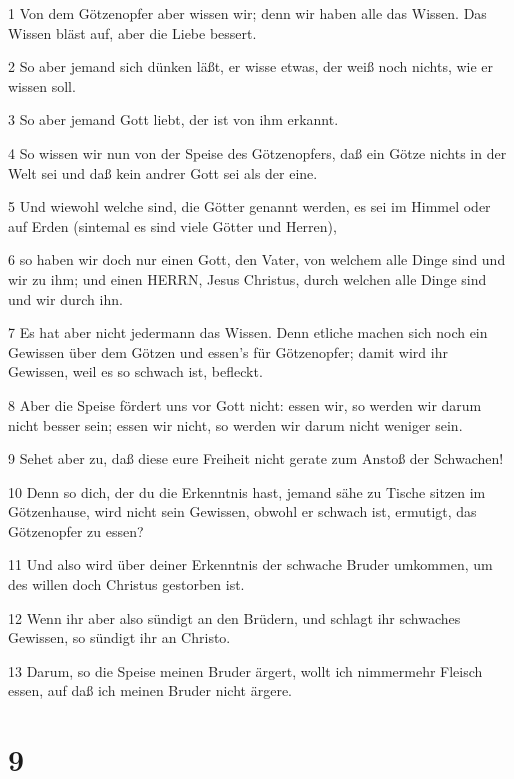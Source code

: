 \par 1 Von dem Götzenopfer aber wissen wir; denn wir haben alle das Wissen. Das Wissen bläst auf, aber die Liebe bessert.
\par 2 So aber jemand sich dünken läßt, er wisse etwas, der weiß noch nichts, wie er wissen soll.
\par 3 So aber jemand Gott liebt, der ist von ihm erkannt.
\par 4 So wissen wir nun von der Speise des Götzenopfers, daß ein Götze nichts in der Welt sei und daß kein andrer Gott sei als der eine.
\par 5 Und wiewohl welche sind, die Götter genannt werden, es sei im Himmel oder auf Erden (sintemal es sind viele Götter und Herren),
\par 6 so haben wir doch nur einen Gott, den Vater, von welchem alle Dinge sind und wir zu ihm; und einen HERRN, Jesus Christus, durch welchen alle Dinge sind und wir durch ihn.
\par 7 Es hat aber nicht jedermann das Wissen. Denn etliche machen sich noch ein Gewissen über dem Götzen und essen's für Götzenopfer; damit wird ihr Gewissen, weil es so schwach ist, befleckt.
\par 8 Aber die Speise fördert uns vor Gott nicht: essen wir, so werden wir darum nicht besser sein; essen wir nicht, so werden wir darum nicht weniger sein.
\par 9 Sehet aber zu, daß diese eure Freiheit nicht gerate zum Anstoß der Schwachen!
\par 10 Denn so dich, der du die Erkenntnis hast, jemand sähe zu Tische sitzen im Götzenhause, wird nicht sein Gewissen, obwohl er schwach ist, ermutigt, das Götzenopfer zu essen?
\par 11 Und also wird über deiner Erkenntnis der schwache Bruder umkommen, um des willen doch Christus gestorben ist.
\par 12 Wenn ihr aber also sündigt an den Brüdern, und schlagt ihr schwaches Gewissen, so sündigt ihr an Christo.
\par 13 Darum, so die Speise meinen Bruder ärgert, wollt ich nimmermehr Fleisch essen, auf daß ich meinen Bruder nicht ärgere.

\chapter{9}

